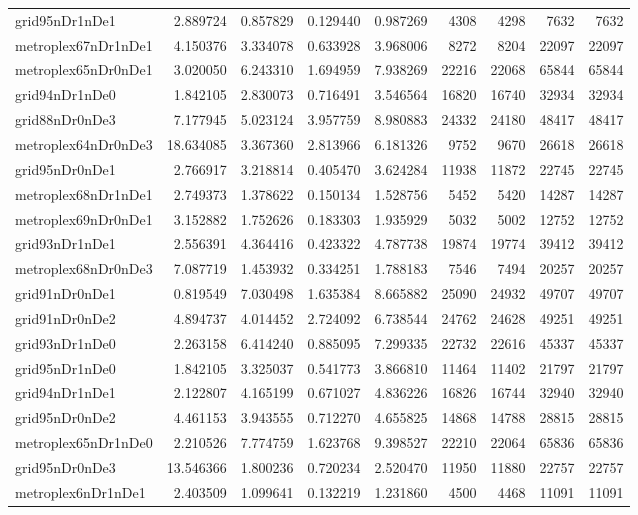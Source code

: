 \begin{longtable}{|l|r|r|r|r|r|r|r|r|}
grid95nDr1nDe1 & 2.889724 & 0.857829 & 0.129440 & 0.987269 & 4308 & 4298 & 7632 & 7632 \\
metroplex67nDr1nDe1 & 4.150376 & 3.334078 & 0.633928 & 3.968006 & 8272 & 8204 & 22097 & 22097 \\
metroplex65nDr0nDe1 & 3.020050 & 6.243310 & 1.694959 & 7.938269 & 22216 & 22068 & 65844 & 65844 \\
grid94nDr1nDe0 & 1.842105 & 2.830073 & 0.716491 & 3.546564 & 16820 & 16740 & 32934 & 32934 \\
grid88nDr0nDe3 & 7.177945 & 5.023124 & 3.957759 & 8.980883 & 24332 & 24180 & 48417 & 48417 \\
metroplex64nDr0nDe3 & 18.634085 & 3.367360 & 2.813966 & 6.181326 & 9752 & 9670 & 26618 & 26618 \\
grid95nDr0nDe1 & 2.766917 & 3.218814 & 0.405470 & 3.624284 & 11938 & 11872 & 22745 & 22745 \\
metroplex68nDr1nDe1 & 2.749373 & 1.378622 & 0.150134 & 1.528756 & 5452 & 5420 & 14287 & 14287 \\
metroplex69nDr0nDe1 & 3.152882 & 1.752626 & 0.183303 & 1.935929 & 5032 & 5002 & 12752 & 12752 \\
grid93nDr1nDe1 & 2.556391 & 4.364416 & 0.423322 & 4.787738 & 19874 & 19774 & 39412 & 39412 \\
metroplex68nDr0nDe3 & 7.087719 & 1.453932 & 0.334251 & 1.788183 & 7546 & 7494 & 20257 & 20257 \\
grid91nDr0nDe1 & 0.819549 & 7.030498 & 1.635384 & 8.665882 & 25090 & 24932 & 49707 & 49707 \\
grid91nDr0nDe2 & 4.894737 & 4.014452 & 2.724092 & 6.738544 & 24762 & 24628 & 49251 & 49251 \\
grid93nDr1nDe0 & 2.263158 & 6.414240 & 0.885095 & 7.299335 & 22732 & 22616 & 45337 & 45337 \\
grid95nDr1nDe0 & 1.842105 & 3.325037 & 0.541773 & 3.866810 & 11464 & 11402 & 21797 & 21797 \\
grid94nDr1nDe1 & 2.122807 & 4.165199 & 0.671027 & 4.836226 & 16826 & 16744 & 32940 & 32940 \\
grid95nDr0nDe2 & 4.461153 & 3.943555 & 0.712270 & 4.655825 & 14868 & 14788 & 28815 & 28815 \\
metroplex65nDr1nDe0 & 2.210526 & 7.774759 & 1.623768 & 9.398527 & 22210 & 22064 & 65836 & 65836 \\
grid95nDr0nDe3 & 13.546366 & 1.800236 & 0.720234 & 2.520470 & 11950 & 11880 & 22757 & 22757 \\
metroplex6nDr1nDe1 & 2.403509 & 1.099641 & 0.132219 & 1.231860 & 4500 & 4468 & 11091 & 11091 \\

\end{longtable}
